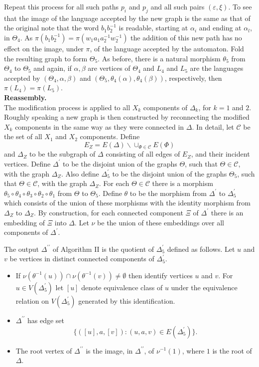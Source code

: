 \documentclass[a4paper,12pt]{article}
\renewcommand{\a}{\alpha }
\renewcommand{\b}{\beta }
\newcommand{\D}{\Delta }
\newcommand{\e}{\varepsilon }
\newcommand{\T}{\Theta }
\newcommand{\nul}{\emptyset }
\numberwithin{equation}{section}
\numberwithin{figure}{section}
\newcommand{\cC}{\mathcal{C}}
\newcommand{\bs}{\backslash}
\begin{document}
Repeat this process for all such paths $p_i$ and $p_j$ and all such
pairs $(\e,\xi)$.
To see that the image of the language accepted by
 the new graph is the same as that of the original note
that the word $b_1b_2^{-1}$ is readable, starting at $\a_i$ and
ending at $\a_l$, in $\T_4$. As $\pi(b_1b_2^{-1})=\pi(w_1a_1a_2^{-1}w_2^{-1})$
the addition of this new path has no effect on the image, under $\pi$, of
the language accepted by the automaton.
 Fold the resulting graph to form $\T_5$. As before, there is 
a natural morphism $\theta_5$ from $\Theta_4$ to $\Theta_5$ and again, 
if $\a,\b$ are
vertices of $\Theta_4$ and $L_4$ and $L_5$ are the languages accepted by 
$(\Theta_4,\a,\b)$ and $(\Theta_5,\theta_4(\a),\theta_4(\b))$, 
respectively, then $\pi(L_4)=\pi(L_5)$.\\[1em]

\noindent\textbf{Reassembly.}\\
The modification process is applied to all $X_k$ components of $\D_k$,
for $k=1$ and $2$. Roughly speaking a new graph is then constructed by
reconnecting the modified $X_k$ components in the same way as they
were connected in $\D$. In detail,
let $\cC$ be the set of all
$X_1$ and $X_2$ components.
Define
\[E_Z=E(\D)\bs \cup_{\Phi\in \cC} E(\Phi)\]
and $\D_Z$ to be the subgraph of $\D$ consisting of all edges
of $E_Z$, and their incident vertices.
Define $\D^\prime$ to be the disjoint union of the
 graphs $\T$, such that $\T\in \cC$, with  the graph $\D_Z$.
Also define $\D^{\prime}_5$ to be the disjoint union of the graphs
$\T_5$, such that $\T\in \cC$, with the graph $\D_Z$. For each
$\T\in \cC$ there is  a morphism
$\theta_5\circ\theta_4\circ\theta_3\circ\theta_2\circ\theta_1$
from $\T$ to $\T_5$. Define $\theta$ to be the morphism from
$\D^\prime$ to $\D^\prime_5$ which consists of the union of these
morphisms with the identity morphism from $\D_Z$ to $\D_Z$. By
construction, for each connected component $\Xi$ of $\D^\prime$
there is an embedding of $\Xi$ into $\D$. Let $\nu$ be the union
of these embeddings over all components of $\D^\prime$.

The output $\D^{\prime\prime}$  of Algorithm II is the quotient of
 $\D^\prime_5$ defined as follows.
Let $u$ and $v$ be vertices in
distinct connected components of $\D^\prime_5$.
\begin{itemize}
\item If $\nu(\theta^{-1}(u))\cap \nu(\theta^{-1}(v))\neq \nul$ then
identify vertices $u$ and $v$. 
For $u \in V(\D^\prime_5)$ let
$[u]$  denote equivalence class of $u$ under the equivalence relation
on $V(\D^\prime_5)$ generated by this identification.
\item 
$\D^{\prime\prime}$ has edge set 
\[\{([u],a,[v]): (u,a,v)\in E(\D^\prime_5)\}.\]
\item The root vertex of $\D^{\prime\prime}$ is the image, in
$\D^{\prime\prime}$, of $\nu^{-1}(1)$, where $1$ is  the root of
$\D$. 
\end{itemize}
\end{document}
